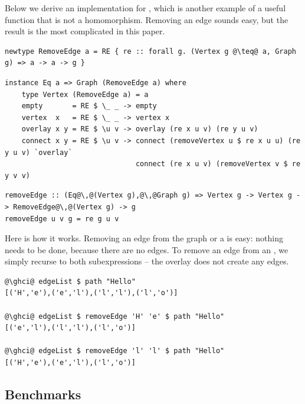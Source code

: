 Below we derive an implementation for , which is another
example of a useful function that is not a homomorphism. Removing an edge sounds
easy, but the result is the most complicated  in this paper.

\begin{verbatim}
newtype RemoveEdge a = RE { re :: forall g. (Vertex g @\teq@ a, Graph g) => a -> a -> g }
\end{verbatim}
\vspace{1mm}
\begin{verbatim}
instance Eq a => Graph (RemoveEdge a) where
    type Vertex (RemoveEdge a) = a
    empty       = RE $ \_ _ -> empty
    vertex  x   = RE $ \_ _ -> vertex x
    overlay x y = RE $ \u v -> overlay (re x u v) (re y u v)
    connect x y = RE $ \u v -> connect (removeVertex u $ re x u u) (re y u v) `overlay`
                               connect (re x u v) (removeVertex v $ re y v v)
\end{verbatim}
\vspace{1mm}
\begin{verbatim}
removeEdge :: (Eq@\,@(Vertex g),@\,@Graph g) => Vertex g -> Vertex g -> RemoveEdge@\,@(Vertex g) -> g
removeEdge u v g = re g u v
\end{verbatim}

\noindent
Here is how it works. Removing an edge from the  graph or a  is easy:
nothing needs to be done, because there are no edges. To remove an edge from an
, we simply recurse to both subexpressions -- the overlay does not create
any edges.

\begin{verbatim}
@\ghci@ edgeList $ path "Hello"
[('H','e'),('e','l'),('l','l'),('l','o')]

@\ghci@ edgeList $ removeEdge 'H' 'e' $ path "Hello"
[('e','l'),('l','l'),('l','o')]

@\ghci@ edgeList $ removeEdge 'l' 'l' $ path "Hello"
[('H','e'),('e','l'),('l','o')]
\end{verbatim}

\subsection{Benchmarks}\label{sub-benchmarks}


